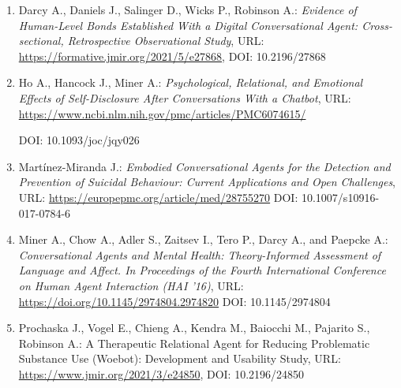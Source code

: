 \documentclass[11pt]{article}
\begin{document}
\begin{enumerate}

\item Darcy A., Daniels J., Salinger D., Wicks P., Robinson A.:
\textit{Evidence of Human-Level Bonds Established With a Digital Conversational Agent: Cross-sectional, Retrospective Observational Study},
URL: \url{https://formative.jmir.org/2021/5/e27868},
DOI: 10.2196/27868

\item Ho A., Hancock J., Miner A.:
\textit{Psychological, Relational, and Emotional Effects of
Self-Disclosure After Conversations With a Chatbot},
URL: \url{https://www.ncbi.nlm.nih.gov/pmc/articles/PMC6074615/}

DOI: 10.1093/joc/jqy026

\item Martínez-Miranda J.: 
\textit{Embodied Conversational Agents for the Detection and 
Prevention of Suicidal Behaviour: 
Current Applications and Open Challenges},
URL: \url{https://europepmc.org/article/med/28755270}
DOI: 10.1007/s10916-017-0784-6

\item Miner A., Chow A., Adler S., Zaitsev I., Tero P., Darcy A., and Paepcke A.:
\textit{Conversational Agents and Mental Health: Theory-Informed Assessment of Language and
Affect. In Proceedings of the Fourth International Conference on Human Agent Interaction (HAI
'16)},
URL: \url{https://doi.org/10.1145/2974804.2974820}
DOI: 10.1145/2974804

\item Prochaska J., Vogel E., Chieng A., Kendra M., Baiocchi M., Pajarito S., Robinson A.:
A Therapeutic Relational Agent for Reducing Problematic Substance Use (Woebot): Development and Usability Study, 
URL: \url{https://www.jmir.org/2021/3/e24850},
DOI: 10.2196/24850
\end{enumerate}
\end{document}
